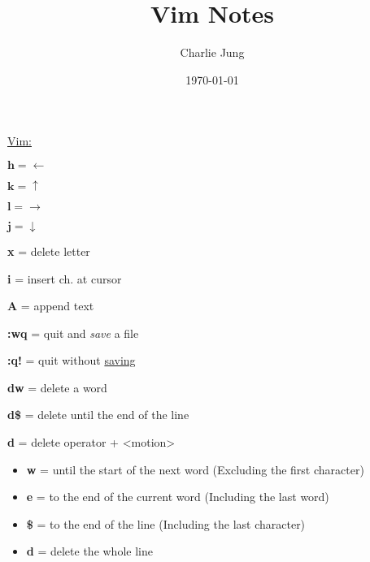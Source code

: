 \documentclass[12pt, letterpaper]{article}
\title {\textbf{Vim} Notes}
\author{Charlie Jung}
\date{\today}
\begin{document}
\maketitle

\newpage
\underline{Vim:} 



\begin{flushleft}



$\textbf{h} =  \leftarrow $





$\textbf{k} = \uparrow  $
\par

$\textbf{l}  = \rightarrow $
\par

$\textbf{j} = \downarrow $
\par

\textbf{x} = delete letter \\
\par 
\textbf{i} = insert ch. at cursor  \\
\par
\textbf{A} = append text \\
\par
\textbf{:wq} = quit and \textit{save} a file \\
\par
\textbf{:q!} = quit without \underline{saving} \\
\par
\textbf{dw} = delete a word \\
\par
\textbf{d\$} = delete until the end of the line \\
\par
\textbf{d} = delete operator + <motion> 

\begin{itemize}
    \item \textbf{w} = until the start of the next word (Excluding the first character) 
    \item \textbf{e} = to the end of the current word (Including the last word) \par
    \item \textbf{\$} = to the end of the line (Including the last character)  \par 
    \item \textbf{d} = delete the whole line \par 
\end{itemize}



\end{flushleft}
\end{document}
